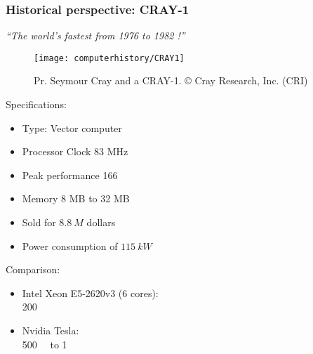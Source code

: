 \begin{frame}
  \frametitle{Historical perspective: CRAY-1}
\begin{center}
\textit{``The world’s fastest from 1976 to 1982 !''}
\end{center}
\begin{minipage}[bc]{0.4\linewidth}
\begin{figure}
\centering
\texttt{[image: computerhistory/CRAY1]}
\caption{Pr. Seymour Cray and a CRAY-1. © Cray Research, Inc. (CRI)}
\end{figure}
\end{minipage}
\begin{minipage}[bc]{0.55\linewidth}
Specifications:
\begin{itemize}
\item Type: Vector computer
\item Processor Clock 83 MHz
\item Peak performance \SI{166}{\mega\flop}
\item Memory 8 MB to 32 MB
\item Sold for $\SI{8.8}{M}$ dollars
\item Power consumption of $\SI{115}{kW}$
\end{itemize}
Comparison:
\begin{itemize}
\item Intel Xeon E5-2620v3 (6 cores):\\
\SI{200}{\giga\flop}
\item Nvidia Tesla:\\
\SI{500}{\giga\flop} to \SI{1}{\tera\flop}
\end{itemize}
\end{minipage}

\end{frame}

